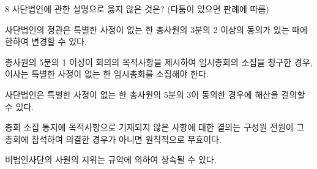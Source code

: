 \begin{question}{8}
사단법인에 관한 설명으로 옳지 않은 것은? (다툼이 있으면 판례에 따름)
\begin{choices}
  \item 사단법인의 정관은 특별한 사정이 없는 한 총사원의 3분의 2 이상의 동의가 있는 때에 한하여 변경할 수 있다.
  \item 총사원의 5분의 1 이상이 회의의 목적사항을 제시하여 임시총회의 소집을 청구한 경우, 이사는 특별한 사정이 없는 한 임시총회를 소집해야 한다.
  \item 사단법인은 특별한 사정이 없는 한 총사원의 5분의 3이 동의한 경우에 해산을 결의할 수 있다.
  \item 총회 소집 통지에 목적사항으로 기재되지 않은 사항에 대한 결의는 구성원 전원이 그 총회에 참석하여 의결한 경우가 아니면 원칙적으로 무효이다.
  \item 비법인사단의 사원의 지위는 규약에 의하여 상속될 수 있다.
\end{choices}
\end{question}
